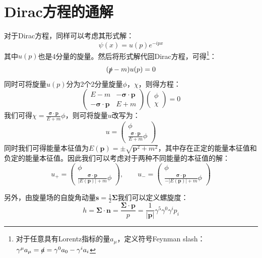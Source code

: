 \section{Dirac方程的通解}
对于Dirac方程，同样可以考虑其形式解：
\begin{equation}
\psi(x)=u(p)e^{-ipx}
\end{equation}
其中$u(p)$也是4分量的旋量。然后将形式解代回Dirac方程，可得\footnote{对于任意具有Lorentz指标的量$a_\mu$，定义符号Feynman slash：$\gamma^\mu a_\mu=\slashed{a}=\gamma^0a_0-\gamma^ia_i$}：
\begin{equation}
(\slashed{p}-m)u(p)=0
\end{equation}
同时可将旋量$u(p)$分为2个2分量旋量$\phi$，$\chi$，则得方程：
\begin{equation}
\begin{pmatrix}
E-m&	-\boldsymbol{\sigma}\cdot\boldsymbol{p}\\
-\boldsymbol{\sigma}\cdot\boldsymbol{p}&	E+m
\end{pmatrix}\begin{pmatrix}
\phi\\
\chi
\end{pmatrix}=0
\end{equation}
我们可得$\chi=\frac{\boldsymbol{\sigma}\cdot\boldsymbol{p}}{E+m}\phi$，则可将旋量$u$改写为：
\begin{equation}
u=\begin{pmatrix}
\phi\\
\frac{\boldsymbol{\sigma}\cdot\boldsymbol{p}}{E+m}\phi
\end{pmatrix}
\end{equation}
同时我们可得能量本征值为$E(\boldsymbol{p})=\pm\sqrt{\boldsymbol{p}^2+m^2}$，其中存在正定的能量本征值和负定的能量本征值。因此我们可以考虑对于两种不同能量的本征值的解：
\begin{equation}
u_{+}=\begin{pmatrix}
\phi\\
\frac{\boldsymbol{\sigma}\cdot\boldsymbol{p}}{|E(\boldsymbol{p})|+m}\phi
\end{pmatrix},\qquad
u_{-}=\begin{pmatrix}
\phi\\
\frac{\boldsymbol{\sigma}\cdot\boldsymbol{p}}{-|E(\boldsymbol{p})|+m}\phi
\end{pmatrix}
\end{equation}
\par 另外，由旋量场的自旋角动量$\boldsymbol{s}=\frac{1}{2}\boldsymbol{\Sigma}$我们可以定义螺旋度：
\begin{equation}
h=\boldsymbol{\Sigma}\cdot\boldsymbol{n}=\frac{\boldsymbol{\Sigma}\cdot\boldsymbol{p}}{p}=\frac{1}{|\boldsymbol{p}|}\gamma^5\gamma^0\gamma^i p_i
\end{equation}
